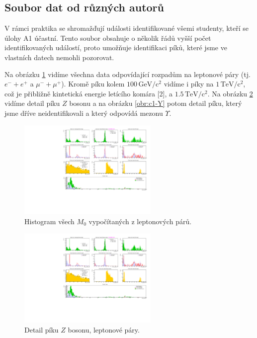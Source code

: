 \documentclass[10pt,a4paper]{article}
\renewcommand{\U}[1]{\ensuremath{\,\mathrm{#1}}}
\newcommand{\°}{\degree}
\begin{document}
\subsection{Soubor dat od různých autorů}
V rámci praktika se shromažďují události identifikované všemi studenty, kteří se úlohy A1 účastní. Tento soubor obsahuje o několik řádů vyšší počet identifikovaných událostí, proto umožňuje identifikaci píků, které jsme ve vlastních datech nemohli pozorovat.

Na obrázku \ref{obr:c1-full} vidíme všechna data odpovídající rozpadům na leptonové páry (tj. $e^- \!\!+\! e^+$ a $\mu^- \!\!+\! \mu^+$). Kromě píku kolem $100 \U{GeV/c^2}$ vidíme i píky na $1 \U{TeV/c^2}$, což je přibližně kintetická energie letícího komára [2], a $1.5 \U{TeV/c^2}$. Na obrázku \ref{obr:c1-Z} vidíme detail píku $Z$ bosonu a na obrázku \ref{obr:c1-Y} potom detail píku, který jsme dříve neidentifikovali a který odpovídá mezonu $\Upsilon$.

\begin{figure}[h]
    \centering
    \includegraphics[width=0.6\textwidth]{c1_full.pdf}
    \vspace{-\baselineskip}
    \caption{Histogram všech $M_0$ vypočítaných z leptonových párů.}
    \label{obr:c1-full}
\end{figure}

\begin{figure}[h]
    \centering
    \includegraphics[width=0.6\textwidth]{c1_Z.pdf}
    \vspace{-\baselineskip}
    \caption{Detail píku $Z$ bosonu, leptonové páry.}
    \label{obr:c1-Z}
\end{figure}
\end{document}
